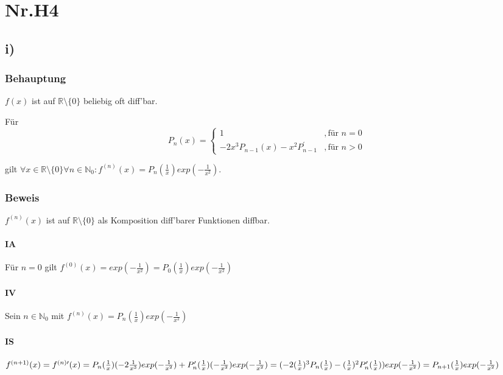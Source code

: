 \section*{Nr.H4}

\subsection*{i)}

\subsubsection*{Behauptung}

$f(x)$ ist auf $\mathbb{R} \setminus \{0\}$ beliebig oft diff'bar.
	
Für
	\[ P_{n}(x) = 
		\begin{cases} 
			1                                         &, \text{für } n = 0 \\
			-2x^{3}P_{n-1}(x)-x^{2}P^{\prime}_{n-1}   &, \text{für } n > 0 
		\end{cases} 
	\]
	
gilt $\forall x \in \mathbb{R} \setminus \{0\} \forall n \in \mathbb{N}_{0} : 
	f^{(n)}(x)= P_{n}(\frac{1}{x})exp(- \frac{1}{x^{2}})$.

\subsubsection*{Beweis}

$f^{(n)}(x)$ ist auf $\mathbb{R} \setminus \{0\}$ als Komposition diff'barer Funktionen diffbar.

\paragraph*{IA}
	
Für $n = 0$ gilt $f^{(0)}(x) = exp(- \frac{1}{x^{2}}) = P_{0}(\frac{1}{x})exp(- \frac{1}{x^{2}})$

\paragraph*{IV}

Sein $n \in \mathbb{N}_{0}$ mit $f^{(n)}(x)= P_{n}(\frac{1}{x})exp(- \frac{1}{x^{2}})$

\paragraph*{IS}

$f^{(n+1)}(x) = f^{(n)\prime}(x)\\
	= P_{n}(\frac{1}{x})(-2\frac{1}{x^{3}})exp(- \frac{1}{x^{2}}) 
		+ P^{\prime}_{n}(\frac{1}{x})(-\frac{1}{x^{2}})exp(- \frac{1}{x^{2}}) \\
	= (-2(\frac{1}{x})^{3}P_{n}(\frac{1}{x})
		 -(\frac{1}{x})^{2}P^{\prime}_{n}(\frac{1}{x}))exp(- \frac{1}{x^{2}}) \\
	= P_{n+1}(\frac{1}{x})exp(- \frac{1}{x^{2}})$ 
	
